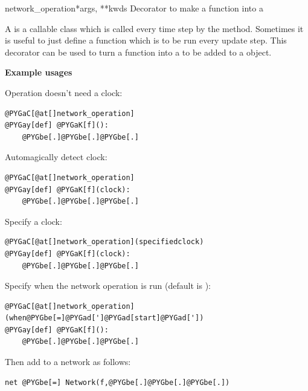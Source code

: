\documentclass[letterpaper,10pt]{manual}
\begin{document}
\hypertarget{brian.network_operation}{}\begin{funcdesc}{network\_operation}{*args, **kwds}
Decorator to make a function into a \hyperlink{brian.NetworkOperation}{}

A \hyperlink{brian.NetworkOperation}{} is a callable class which is called every
time step by the \hyperlink{brian.Network}{}  method. Sometimes it is useful
to just define a function which is to be run every update step. This
decorator can be used to turn a function into a \hyperlink{brian.NetworkOperation}{}
to be added to a \hyperlink{brian.Network}{} object.

\textbf{Example usages}

Operation doesn't need a clock:

\begin{Verbatim}[commandchars=@\[\]]
@PYGaC[@at[]network_operation]
@PYGay[def] @PYGaK[f]():
    @PYGbe[.]@PYGbe[.]@PYGbe[.]
\end{Verbatim}

Automagically detect clock:

\begin{Verbatim}[commandchars=@\[\]]
@PYGaC[@at[]network_operation]
@PYGay[def] @PYGaK[f](clock):
    @PYGbe[.]@PYGbe[.]@PYGbe[.]
\end{Verbatim}

Specify a clock:

\begin{Verbatim}[commandchars=@\[\]]
@PYGaC[@at[]network_operation](specifiedclock)
@PYGay[def] @PYGaK[f](clock):
    @PYGbe[.]@PYGbe[.]@PYGbe[.]
\end{Verbatim}

Specify when the network operation is run (default is ):

\begin{Verbatim}[commandchars=@\[\]]
@PYGaC[@at[]network_operation](when@PYGbe[=]@PYGad[']@PYGad[start]@PYGad['])
@PYGay[def] @PYGaK[f]():
    @PYGbe[.]@PYGbe[.]@PYGbe[.]
\end{Verbatim}

Then add to a network as follows:

\begin{Verbatim}[commandchars=@\[\]]
net @PYGbe[=] Network(f,@PYGbe[.]@PYGbe[.]@PYGbe[.])
\end{Verbatim}
\end{funcdesc}
\end{document}
